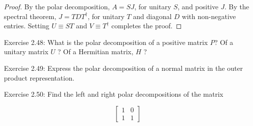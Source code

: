 \begin{proof}
    By the polar decomposition, $A=S J$, for unitary $S$, and positive $J$. By the spectral theorem, $J=T D T^{\dagger}$, for unitary $T$ and diagonal $D$ with non-negative entries. Setting $U \equiv S T$ and $V \equiv T^{\dagger}$ completes the proof.
\end{proof}

\begin{exercise}
Exercise 2.48: What is the polar decomposition of a positive matrix $P$? Of a unitary matrix $U$ ? Of a Hermitian matrix, $H$ ?
\end{exercise}

\begin{exercise}
Exercise 2.49: Express the polar decomposition of a normal matrix in the outer product representation.
\end{exercise}

\begin{exercise}
Exercise 2.50: Find the left and right polar decompositions of the matrix

$$
\left[\begin{array}{ll}
1 & 0 \\
1 & 1
\end{array}\right]
$$
\end{exercise}